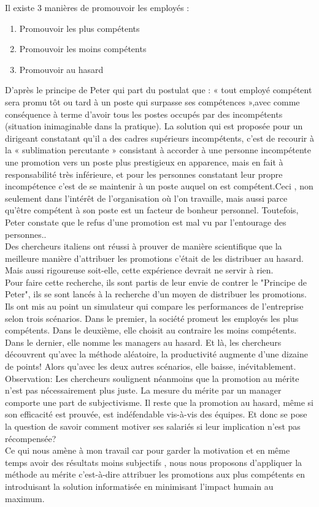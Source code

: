Il existe 3 manières de promouvoir les employés :
\begin{enumerate}
\item Promouvoir les plus compétents
\item Promouvoir les moins compétents
\item Promouvoir au hasard
\end{enumerate}
\newpage
D’après le principe de Peter qui part du postulat que : «  tout employé compétent sera promu tôt ou tard à un poste qui surpasse ses compétences »,avec comme conséquence à terme d'avoir tous les postes occupés par des incompétents (situation inimaginable dans la pratique).
La solution qui est proposée pour un dirigeant constatant qu'il a des cadres supérieurs incompétents, c’est de recourir à la « sublimation percutante » consistant à accorder à une personne incompétente une promotion vers un poste plus prestigieux en apparence, mais en fait à responsabilité très inférieure, et pour les personnes constatant leur propre incompétence c’est de se maintenir à un poste auquel on est compétent.Ceci , non seulement dans l'intérêt de l'organisation où l'on travaille, mais aussi parce qu'être compétent à son poste est un facteur de bonheur personnel. Toutefois, Peter constate que le refus d'une promotion est mal vu par l'entourage des personnes..\\
Des chercheurs italiens ont réussi à prouver de manière scientifique que la meilleure manière d'attribuer les promotions c’était de les distribuer au hasard. Mais aussi rigoureuse soit-elle, cette expérience devrait ne servir à rien.\\
Pour faire cette recherche, ils sont partis de leur envie de contrer le "Principe de Peter", ils se sont lancés à la recherche d’un moyen de distribuer les promotions. Ils ont mis au point un simulateur qui compare les performances de l’entreprise selon trois scénarios. Dans le premier, la société promeut les employés les plus compétents. Dans le deuxième, elle choisit au contraire les moins compétents. Dans le dernier, elle nomme les managers au hasard. Et là, les chercheurs découvrent qu'avec la méthode aléatoire, la productivité augmente d’une dizaine de points! Alors qu’avec les deux autres scénarios, elle baisse, inévitablement.\\
 Observation: Les chercheurs soulignent néanmoins que la promotion au mérite n’est pas nécessairement plus juste. La mesure du mérite par un manager comporte une part de subjectivisme. Il reste que la promotion au hasard, même si son efficacité est prouvée, est indéfendable vis-à-vis des équipes. Et donc se pose la question de savoir comment motiver ses salariés si leur implication n’est pas récompensée?\\
Ce qui nous amène à mon travail car pour garder la motivation et en même temps avoir des résultats moins subjectifs , nous nous  proposons d’appliquer la méthode au mérite c’est-à-dire attribuer les promotions aux plus compétents en introduisant la solution informatisée en minimisant l’impact humain au maximum.\\   


